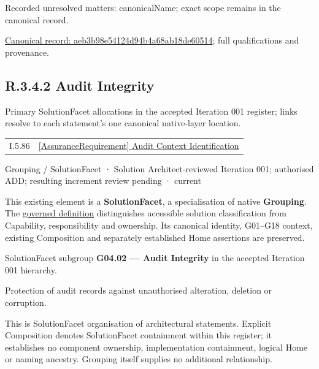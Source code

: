 {\small Recorded unresolved matters: canonicalName; exact scope remains in the canonical record.}\par
{\footnotesize \href{../../../../../../../continuum/grouping/aeb3b98e54124d94b4a68ab18de60514.md}{Canonical record: aeb3b98e54124d94b4a68ab18de60514}; full qualifications and provenance.}\par
\subsection*{R.3.4.2 Audit Integrity}
\label{navigation:R.3.4.2}

Primary SolutionFacet allocations in the accepted Iteration 001 register; links resolve to each statement’s one canonical native-layer location.\par
\begin{longtable}{p{.22\linewidth}p{.73\linewidth}}
I.5.86 & \hyperref[element:de466c998be34fae87a2be41983cbcdd]{[AssuranceRequirement] Audit Context Identification} \\
\end{longtable}
\label{element:c102ede2b9e249b2a2ddc9f19e0cbd7f}
{\small Grouping / SolutionFacet · Solution Architect-reviewed Iteration 001; authorised ADD; resulting increment review pending · current}\par

This existing element is a \textbf{SolutionFacet}, a specialisation of native
\textbf{Grouping}. The \href{\detokenize{../../../../../../../governance/continuum-representation.md#solutionfacet-classification--1119-candidate}}{governed definition}
distinguishes accessible solution classification from Capability, responsibility
and ownership. Its canonical identity, G01–G18 context, existing Composition
and separately established Home assertions are preserved.



SolutionFacet subgroup \textbf{G04.02 — Audit Integrity} in the accepted Iteration 001 hierarchy.



Protection of audit records against unauthorised alteration, deletion or corruption.



This is SolutionFacet organisation of architectural statements. Explicit Composition denotes SolutionFacet containment within this register; it establishes no component ownership, implementation containment, logical Home or naming ancestry. Grouping itself supplies no additional relationship.


